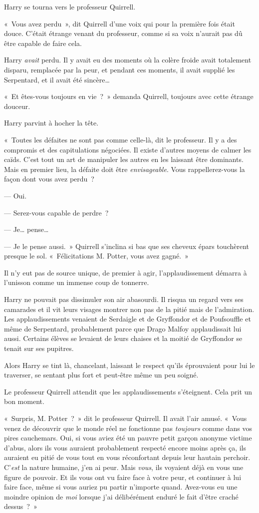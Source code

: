 Harry se tourna vers le professeur Quirrell.

«~Vous avez perdu~», dit Quirrell d'une voix qui pour la première fois était douce.
C'était étrange venant du professeur, comme si sa voix n'aurait pas dû être capable de faire cela.

Harry \emph{avait} perdu.
Il y avait eu des moments où la colère froide avait totalement disparu, remplacée par la peur, et pendant ces moments, il avait supplié les Serpentard, et il avait été sincère…

«~Et êtes-vous toujours en vie~?~»
demanda Quirrell, toujours avec cette étrange douceur.

Harry parvint à hocher la tête.

«~Toutes les défaites ne sont pas comme celle-là, dit le professeur.
Il y a des compromis et des capitulations négociées.
Il existe d'autres moyens de calmer les caïds.
C'est tout un art de manipuler les autres en les laissant être dominants.
Mais en premier lieu, la défaite doit être \emph{envisageable}.
Vous rappellerez-vous la façon dont vous avez perdu~?

--- Oui.

--- Serez-vous capable de perdre~?

--- Je… pense…

--- Je le pense aussi.~»
Quirrell s'inclina si bas que ses cheveux épars touchèrent presque le sol.
«~Félicitations M. Potter, vous avez gagné.~»

Il n'y eut pas de source unique, de premier à agir, l'applaudissement démarra à l'unisson comme un immense coup de tonnerre.


Harry ne pouvait pas dissimuler son air abasourdi.
Il risqua un regard vers ses camarades et il vit leurs visages montrer non pas de la pitié mais de l'admiration.
Les applaudissements venaient de Serdaigle et de Gryffondor et de Poufsouffle et même de Serpentard, probablement parce que Drago Malfoy applaudissait lui aussi.
Certains élèves se levaient de leurs chaises et la moitié de Gryffondor se tenait sur ses pupitres.

Alors Harry se tint là, chancelant, laissant le respect qu'ils éprouvaient pour lui le traverser, se sentant plus fort et peut-être même un peu soigné.

Le professeur Quirrell attendit que les applaudissements s'éteignent.
Cela prit un bon moment.

«~Surpris, M. Potter~?~»
dit le professeur Quirrell.
Il avait l'air amusé.
«~Vous venez de découvrir que le monde réel ne fonctionne pas \emph{toujours} comme dans vos pires cauchemars.
Oui, si vous aviez été un pauvre petit garçon anonyme victime d'abus, alors ils vous auraient probablement respecté encore moins après ça, ils auraient eu pitié de vous tout en vous réconfortant depuis leur hautain perchoir.
C'\emph{est} la nature humaine, j'en ai peur.
Mais \emph{vous}, ils voyaient déjà en vous une figure de pouvoir.
Et ils vous ont vu faire face à votre peur, et continuer à lui faire face, même si vous auriez pu partir n'importe quand.
Avez-vous eu une moindre opinion de \emph{moi} lorsque j'ai délibérément enduré le fait d'être craché dessus~?~»

